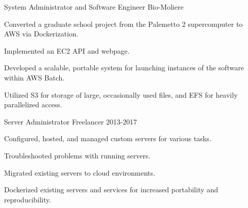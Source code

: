 

\begin{cventries}

  
  \cventry
    {System Administrator and Software Engineer} %
    {Bio-Moliere} %
    {} %
    {} %
    {
      \begin{cvitems} %
        \item {Converted a graduate school project from the Palemetto 2 supercomputer to AWS via Dockerization.}
        \item {Implemented an EC2 API and webpage.}
        \item {Developed a scalable, portable system for launching instances of the software within AWS Batch.}
        \item {Utilized S3 for storage of large, occasionally used files, and EFS for heavily parallelized access.}
      \end{cvitems}
    }
    
  \cventry
    {Server Administrator}
    {Freelancer}
    {}
    {2013-2017}
    {
      \begin{cvitems}
        \item{Configured, hosted, and managed custom servers for various tasks.}%
        \item{Troubleshooted problems with running servers.}
        \item{Migrated existing servers to cloud environments.}
        \item{Dockerized existing servers and services for increased portability and reproducibility.}
      \end{cvitems}
    }

\end{cventries}
